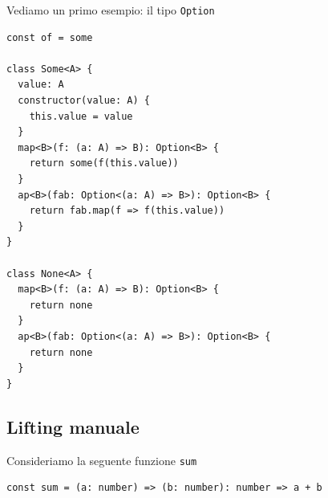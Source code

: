 \documentclass[12pt]{article}
\begin{document}
Vediamo un primo esempio: il tipo \texttt{Option}

\begin{verbatim}
const of = some

class Some<A> {
  value: A
  constructor(value: A) {
    this.value = value
  }
  map<B>(f: (a: A) => B): Option<B> {
    return some(f(this.value))
  }
  ap<B>(fab: Option<(a: A) => B>): Option<B> {
    return fab.map(f => f(this.value))
  }
}

class None<A> {
  map<B>(f: (a: A) => B): Option<B> {
    return none
  }
  ap<B>(fab: Option<(a: A) => B>): Option<B> {
    return none
  }
}
\end{verbatim}










\subsection{Lifting manuale}

Consideriamo la seguente funzione \texttt{sum}

\begin{verbatim}
const sum = (a: number) => (b: number): number => a + b
\end{verbatim}
\end{document}
